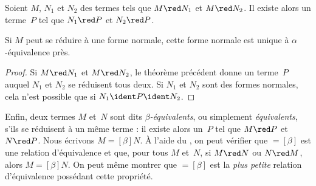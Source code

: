 \documentclass[../../../include/open-logic-section]{subfiles}
\begin{document}

\begin{thm}
Soient $M$, $N_1$ et $N_2$ des termes tels
que $M\red N_1$ et $M\red N_2$. Il existe
alors un terme~$P$ tel que $N_1\red P$
et $N_2\red P$.
\end{thm}

\begin{cor}
Si $M$ peut se réduire à une forme normale,
cette forme normale est unique à $\alpha$-équivalence près.
\end{cor}

\begin{proof}
Si $M\red N_1$ et $M\red N_2$, le théorème
précédent donne un terme~$P$ auquel $N_1$
et $N_2$ se réduisent tous deux. Si $N_1$
et $N_2$ sont des formes normales, cela
n'est possible que si $N_1\ident P\ident N_2$.
\end{proof}

Enfin, deux termes $M$ et~$N$ sont dits
\emph{$\beta$-équivalents}, ou simplement
\emph{équivalents}, s'ils se réduisent à
un même terme : il existe alors un~$P$
tel que $M\red P$ et $N\red P$. Nous
écrivons $M\equal[\beta] N$. À l'aide du
, on peut vérifier
que $\equal[\beta]$ est une relation
d'équivalence et que, pour tous $M$ et~$N$,
si $M\red N$ ou $N\red M$, alors
$M\equal[\beta] N$. On peut même montrer
que $\equal[\beta]$ est la \emph{plus petite}
relation d'équivalence possédant cette
propriété.
\end{document}
